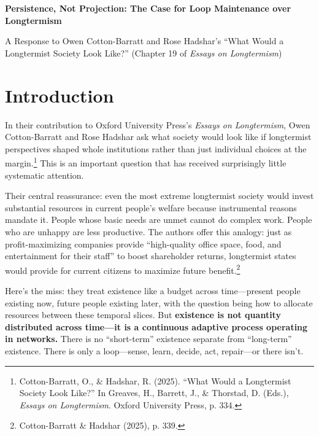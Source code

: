 \documentclass[12pt,a4paper]{article}
\begin{document}
\begin{center}
{\Large\bfseries Persistence, Not Projection: The Case for Loop Maintenance over Longtermism}

\vspace{0.5em}

{\normalsize A Response to Owen Cotton-Barratt and Rose Hadshar's ``What Would a Longtermist Society Look Like?'' (Chapter 19 of \emph{Essays on Longtermism})}
\end{center}

\vspace{1em}

\section{Introduction}

In their contribution to Oxford University Press's \emph{Essays on Longtermism}, Owen Cotton-Barratt and Rose Hadshar ask what society would look like if longtermist perspectives shaped whole institutions rather than just individual choices at the margin.\footnote{Cotton-Barratt, O., \& Hadshar, R. (2025). ``What Would a Longtermist Society Look Like?'' In Greaves, H., Barrett, J., \& Thorstad, D. (Eds.), \emph{Essays on Longtermism}. Oxford University Press, p. 334.} This is an important question that has received surprisingly little systematic attention.

Their central reassurance: even the most extreme longtermist society would invest substantial resources in current people's welfare because instrumental reasons mandate it. People whose basic needs are unmet cannot do complex work. People who are unhappy are less productive. The authors offer this analogy: just as profit-maximizing companies provide ``high-quality office space, food, and entertainment for their staff'' to boost shareholder returns, longtermist states would provide for current citizens to maximize future benefit.\footnote{Cotton-Barratt \& Hadshar (2025), p. 339.}

Here's the miss: they treat existence like a budget across time---present people existing now, future people existing later, with the question being how to allocate resources between these temporal slices. But \textbf{existence is not quantity distributed across time---it is a continuous adaptive process operating in networks.} There is no ``short-term'' existence separate from ``long-term'' existence. There is only a loop---sense, learn, decide, act, repair---or there isn't.
\end{document}
